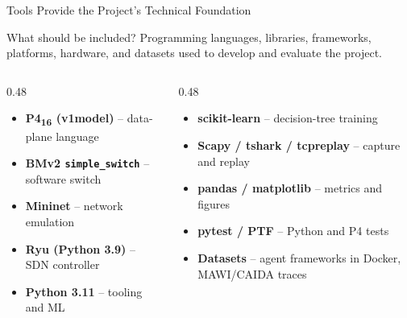 \documentclass[aspectratio=169,11pt]{beamer}
\begin{document}
\begin{frame}{Tools Provide the Project's Technical Foundation}
  \begin{exampleblock}{What should be included?}
    Programming languages, libraries, frameworks, platforms, hardware, and datasets used to develop
    and evaluate the project.
  \end{exampleblock}
  \begin{columns}[T, onlytextwidth]
    \begin{column}{0.48\textwidth}
      \begin{itemize}
        \item \textbf{P4\textsubscript{16} (v1model)} -- data-plane language
        \item \textbf{BMv2 \texttt{simple\_switch}} -- software switch
        \item \textbf{Mininet} -- network emulation
        \item \textbf{Ryu (Python 3.9)} -- SDN controller
        \item \textbf{Python 3.11} -- tooling and ML
      \end{itemize}
    \end{column}
    \begin{column}{0.48\textwidth}
      \begin{itemize}
        \item \textbf{scikit-learn} -- decision-tree training
        \item \textbf{Scapy / tshark / tcpreplay} -- capture and replay
        \item \textbf{pandas / matplotlib} -- metrics and figures
        \item \textbf{pytest / PTF} -- Python and P4 tests
        \item \textbf{Datasets} -- agent frameworks in Docker, MAWI/CAIDA traces
      \end{itemize}
    \end{column}
  \end{columns}
\end{frame}
\end{document}
